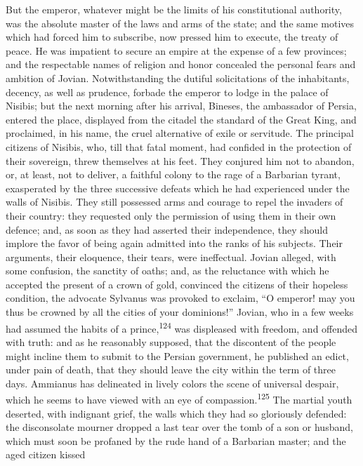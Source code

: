 But the emperor, whatever might be the limits of his
constitutional authority, was the absolute master of the laws and
arms of the state; and the same motives which had forced him to
subscribe, now pressed him to execute, the treaty of peace. He
was impatient to secure an empire at the expense of a few
provinces; and the respectable names of religion and honor
concealed the personal fears and ambition of Jovian.
Notwithstanding the dutiful solicitations of the inhabitants,
decency, as well as prudence, forbade the emperor to lodge in the
palace of Nisibis; but the next morning after his arrival,
Bineses, the ambassador of Persia, entered the place, displayed
from the citadel the standard of the Great King, and proclaimed,
in his name, the cruel alternative of exile or servitude. The
principal citizens of Nisibis, who, till that fatal moment, had
confided in the protection of their sovereign, threw themselves
at his feet. They conjured him not to abandon, or, at least, not
to deliver, a faithful colony to the rage of a Barbarian tyrant,
exasperated by the three successive defeats which he had
experienced under the walls of Nisibis. They still possessed arms
and courage to repel the invaders of their country: they
requested only the permission of using them in their own defence;
and, as soon as they had asserted their independence, they should
implore the favor of being again admitted into the ranks of his
subjects. Their arguments, their eloquence, their tears, were
ineffectual. Jovian alleged, with some confusion, the sanctity of
oaths; and, as the reluctance with which he accepted the present
of a crown of gold, convinced the citizens of their hopeless
condition, the advocate Sylvanus was provoked to exclaim, “O
emperor! may you thus be crowned by all the cities of your
dominions!” Jovian, who in a few weeks had assumed the habits of
a prince,\textsuperscript{124} was displeased with freedom, and offended with
truth: and as he reasonably supposed, that the discontent of the
people might incline them to submit to the Persian government, he
published an edict, under pain of death, that they should leave
the city within the term of three days. Ammianus has delineated
in lively colors the scene of universal despair, which he seems
to have viewed with an eye of compassion.\textsuperscript{125} The martial youth
deserted, with indignant grief, the walls which they had so
gloriously defended: the disconsolate mourner dropped a last tear
over the tomb of a son or husband, which must soon be profaned by
the rude hand of a Barbarian master; and the aged citizen kissed
